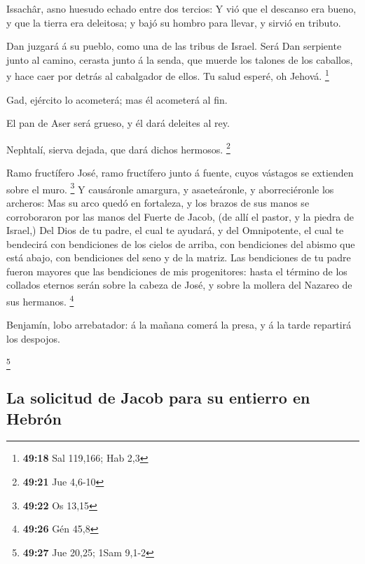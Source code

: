  Issachâr, asno huesudo echado entre dos tercios:
 Y vió que el descanso era bueno, y que la tierra era
deleitosa; y bajó su hombro para llevar, y sirvió en tributo.

 Dan juzgará á su pueblo, como una de las tribus de Israel.
 Será Dan serpiente junto al camino, cerasta junto á la
senda, que muerde los talones de los caballos, y hace caer por detrás al
cabalgador de ellos.  Tu salud esperé, oh Jehová.
\footnote{\textbf{49:18} Sal 119,166; Hab 2,3}

 Gad, ejército lo acometerá; mas él acometerá al fin.

 El pan de Aser será grueso, y él dará deleites al rey.

 Nephtalí, sierva dejada, que dará dichos hermosos.
\footnote{\textbf{49:21} Jue 4,6-10}

 Ramo fructífero José, ramo fructífero junto á fuente,
cuyos vástagos se extienden sobre el muro. \footnote{\textbf{49:22} Os
  13,15}  Y causáronle amargura, y asaeteáronle, y
aborreciéronle los archeros:  Mas su arco quedó en
fortaleza, y los brazos de sus manos se corroboraron por las manos del
Fuerte de Jacob, (de allí el pastor, y la piedra de Israel,)
 Del Dios de tu padre, el cual te ayudará, y del
Omnipotente, el cual te bendecirá con bendiciones de los cielos de
arriba, con bendiciones del abismo que está abajo, con bendiciones del
seno y de la matriz.  Las bendiciones de tu padre fueron
mayores que las bendiciones de mis progenitores: hasta el término de los
collados eternos serán sobre la cabeza de José, y sobre la mollera del
Nazareo de sus hermanos. \footnote{\textbf{49:26} Gén 45,8}

 Benjamín, lobo arrebatador: á la mañana comerá la presa, y
á la tarde repartirá los despojos.

\footnote{\textbf{49:27} Jue 20,25; 1Sam 9,1-2}

\hypertarget{la-solicitud-de-jacob-para-su-entierro-en-hebruxf3n}{%
\subsection{La solicitud de Jacob para su entierro en
Hebrón}\label{la-solicitud-de-jacob-para-su-entierro-en-hebruxf3n}}

